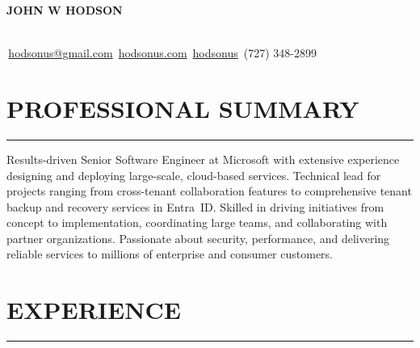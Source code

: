 \documentclass[11pt]{article}
\begin{document}
\noindent
\centerline{\huge \textbf{JOHN W HODSON}}\\[14pt] %
\vspace{0.2cm}
\faEnvelopeSquare \,\href{mailto:hodsonus@gmail.com}{hodsonus@gmail.com}
\hfill
\faHome \,\href{https://hodsonus.com}{hodsonus.com}
\hfill
\faGithub \,\href{https://github.com/hodsonus}{hodsonus}
\hfill
\faMobilePhone \,(727) 348-2899

\vspace{0.6cm}
\section*{PROFESSIONAL SUMMARY}
\hrule
\vspace{0.3cm}
\noindent
Results-driven Senior Software Engineer at Microsoft with extensive experience designing and deploying large-scale, cloud-based services. Technical lead for projects ranging from cross-tenant collaboration features to comprehensive tenant backup and recovery services in Entra~ID. Skilled in driving initiatives from concept to implementation, coordinating large teams, and collaborating with partner organizations. Passionate about security, performance, and delivering reliable services to millions of enterprise and consumer customers.

\vspace{0.6cm}
\section*{EXPERIENCE}
\hrule
\vspace{0.3cm}
\end{document}
